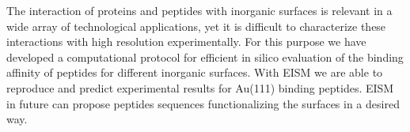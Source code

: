 The interaction of proteins and peptides with inorganic surfaces is relevant in a wide array of technological applications, yet it is difficult to characterize these interactions with high resolution experimentally. For this purpose we have developed a computational protocol for efficient in silico evaluation of the binding affinity of peptides for different inorganic surfaces. With EISM we are able to reproduce and predict experimental results for Au(111) binding peptides. EISM in future can propose peptides sequences functionalizing the surfaces in a desired way. 